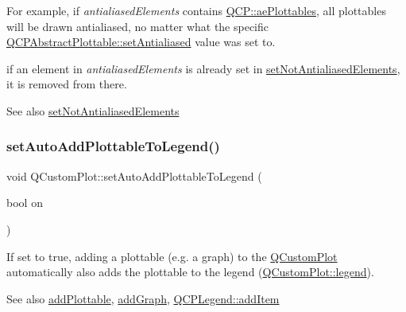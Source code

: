For example, if {\itshape antialiased\+Elements} contains \hyperlink{namespace_q_c_p_ae55dbe315d41fe80f29ba88100843a0ca4145e4251b0cf2dbedabeea0a38f84f6}{Q\+C\+P\+::ae\+Plottables}, all plottables will be drawn antialiased, no matter what the specific \hyperlink{class_q_c_p_layerable_a4fd43e89be4a553ead41652565ff0581}{Q\+C\+P\+Abstract\+Plottable\+::set\+Antialiased} value was set to.

if an element in {\itshape antialiased\+Elements} is already set in \hyperlink{class_q_custom_plot_ae10d685b5eabea2999fb8775ca173c24}{set\+Not\+Antialiased\+Elements}, it is removed from there.

\begin{DoxySeeAlso}{See also}
\hyperlink{class_q_custom_plot_ae10d685b5eabea2999fb8775ca173c24}{set\+Not\+Antialiased\+Elements} 
\end{DoxySeeAlso}
\hypertarget{class_q_custom_plot_ad8858410c2db47b7104040a3aa61c3fc}{}\label{class_q_custom_plot_ad8858410c2db47b7104040a3aa61c3fc} 
\subsubsection{\texorpdfstring{set\+Auto\+Add\+Plottable\+To\+Legend()}{setAutoAddPlottableToLegend()}}
{\footnotesize\ttfamily void Q\+Custom\+Plot\+::set\+Auto\+Add\+Plottable\+To\+Legend (\begin{DoxyParamCaption}\item[{bool}]{on }\end{DoxyParamCaption})}

If set to true, adding a plottable (e.\+g. a graph) to the \hyperlink{class_q_custom_plot}{Q\+Custom\+Plot} automatically also adds the plottable to the legend (\hyperlink{class_q_custom_plot_a4eadcd237dc6a09938b68b16877fa6af}{Q\+Custom\+Plot\+::legend}).

\begin{DoxySeeAlso}{See also}
\hyperlink{class_q_custom_plot_ab7ad9174f701f9c6f64e378df77927a6}{add\+Plottable}, \hyperlink{class_q_custom_plot_a6fb2873d35a8a8089842d81a70a54167}{add\+Graph}, \hyperlink{class_q_c_p_legend_a3ab274de52d2951faea45a6d975e6b3f}{Q\+C\+P\+Legend\+::add\+Item} 
\end{DoxySeeAlso}
\hypertarget{class_q_custom_plot_a130358592cfca353ff3cf5571b49fb00}{}\label{class_q_custom_plot_a130358592cfca353ff3cf5571b49fb00} 
